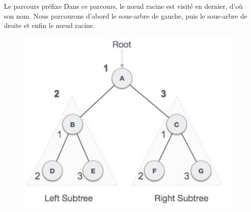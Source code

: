 \documentclass[10pt,xcolor=dvipsnames]{beamer}
\begin{document}
\begin{frame}{Le parcours préfixe}
    Dans ce \alert{parcours}, le nœud racine est visité en dernier, d'où son nom. Nous parcourons d'abord le sous-arbre de gauche, puis le sous-arbre de droite et enfin le nœud racine.
    
    \begin{figure}
    \centering
    \includegraphics[scale=0.2]{figures/CM2/ABR-pref.png}
    \label{fig:my_label}
\end{figure}
\end{frame}

\end{document}
